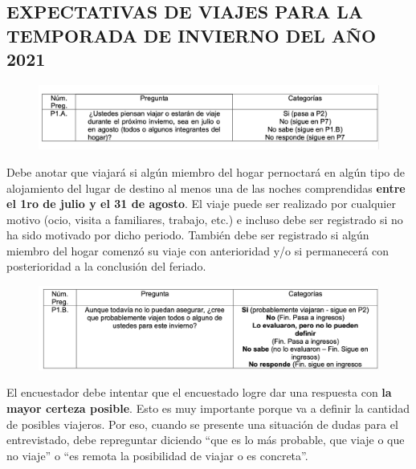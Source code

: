 \documentclass[
  openany]{book}
\begin{document}
\hypertarget{expectativas-de-viajes-para-la-temporada-de-invierno-del-auxf1o-2021}{%
\subsection{\texorpdfstring{\textbf{EXPECTATIVAS DE VIAJES PARA LA TEMPORADA DE INVIERNO DEL AÑO 2021}}{EXPECTATIVAS DE VIAJES PARA LA TEMPORADA DE INVIERNO DEL AÑO 2021}}\label{expectativas-de-viajes-para-la-temporada-de-invierno-del-auxf1o-2021}}

\begin{figure}

{\centering \includegraphics[width=1\linewidth]{imagenes/figura6-304} 

}

\end{figure}

Debe anotar que viajará si algún miembro del hogar pernoctará en algún tipo de alojamiento del lugar de destino al menos una de las noches comprendidas \textbf{entre el 1ro de julio y el 31 de agosto}. El viaje puede ser realizado por cualquier motivo (ocio, visita a familiares, trabajo, etc.) e incluso debe ser registrado si no ha sido motivado por dicho periodo. También debe ser registrado si algún miembro del hogar comenzó su viaje con anterioridad y/o si permanecerá con posterioridad a la conclusión del feriado.

\begin{figure}

{\centering \includegraphics[width=1\linewidth]{imagenes/figura6-305} 

}

\end{figure}

El encuestador debe intentar que el encuestado logre dar una respuesta con \textbf{la mayor certeza posible}. Esto es muy importante porque va a definir la cantidad de posibles viajeros. Por eso, cuando se presente una situación de dudas para el entrevistado, debe repreguntar diciendo ``que es lo más probable, que viaje o que no viaje'' o ``es remota la posibilidad de viajar o es concreta''.
\end{document}
